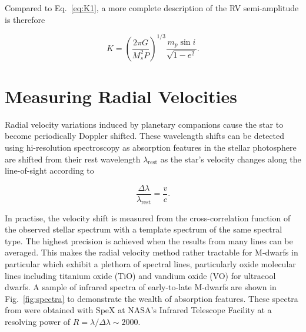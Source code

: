 Compared to Eq.~\ref{eq:K1}, 
a more complete description of the RV semi-amplitude is therefore 

\begin{equation}
K = \left( \frac{2\pi G}{M_s^2 P} \right)^{1/3} \frac{m_p \sin{i}}{\sqrt{1-e^2}}. 
\label{eq:K2}
\end{equation}

\section{Measuring Radial Velocities} \label{sect:spectrograph}
Radial velocity variations induced by planetary companions cause the star to become 
periodically Doppler shifted. These wavelength shifts can be detected using hi-resolution 
spectroscopy as absorption features in the stellar photosphere are shifted from their 
rest wavelength $\lambda_{\mathrm{rest}}$ as the star's velocity changes along the line-of-sight 
according to 

\begin{equation}
\frac{\Delta \lambda}{\lambda_{\mathrm{rest}}} = \frac{v}{c}.
\end{equation}

\noindent In practise, the velocity shift is measured from the cross-correlation function of 
the observed stellar spectrum with a template spectrum of the same spectral type. The highest 
precision is achieved when the results from many lines can be averaged. This makes the radial 
velocity method rather tractable for M-dwarfs in particular which exhibit a plethora of 
spectral lines, particularly oxide molecular lines including titanium oxide (TiO) and vandium 
oxide (VO) for ultracool dwarfs. A sample of infrared spectra of early-to-late M-dwarfs 
are shown in Fig.~\ref{fig:spectra} to demonstrate the wealth of absorption features. 
These spectra from \cite{rayner09} were obtained 
with SpeX at NASA's Infrared Telescope Facility at a resolving power of 
$R=\lambda / \Delta \lambda \sim 2000$. \\ 


